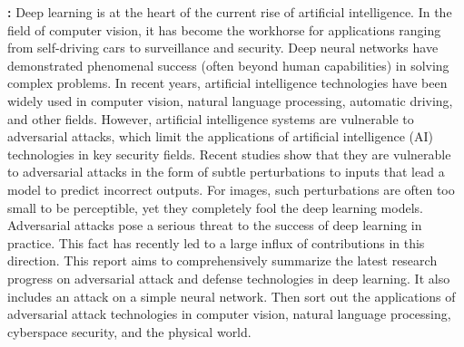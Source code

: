 \textbf{\abstractname{:}} Deep learning is at the heart of the current rise of artificial intelligence. In the field of computer vision, it has become the workhorse for applications ranging from self-driving cars to surveillance and security. Deep neural networks have demonstrated phenomenal success (often beyond human capabilities) in solving complex problems. In recent years, artificial intelligence technologies have been widely used in computer vision, natural language processing, automatic driving, and other fields. However, artificial intelligence systems are vulnerable to adversarial attacks, which limit the applications of artificial intelligence (AI) technologies in key security fields. Recent studies show that they are vulnerable to adversarial attacks in the form of subtle perturbations to inputs that lead a model to predict incorrect outputs. For images, such perturbations are often too small to be perceptible, yet they completely fool the deep learning models. Adversarial attacks pose a serious threat to the success of deep learning in practice. This fact has recently led to a large influx of contributions in this direction. This report aims to comprehensively summarize the latest research progress on adversarial attack and defense technologies in deep learning. It also includes an attack on a simple neural network. Then sort out the applications of adversarial attack technologies in computer vision, natural language processing, cyberspace security, and the physical world.    
